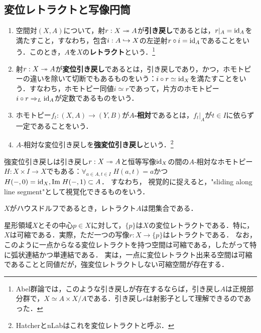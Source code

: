\documentclass[uplatex,dvipdfmx]{jsreport}
\begin{document}
\subsection{変位レトラクトと写像円筒}

\begin{definition}\mbox{}
    \begin{enumerate}
        \item 空間対$(X,A)$について，射$r:X\twoheadrightarrow A$が\textbf{引き戻し}であるとは，$r|_A=\mathrm{id}_A$を満たすこと，すなわち，包含$i:A\hookrightarrow X$の左逆射$r\circ i=\mathrm{id}_A$であることをいう．このとき，$A$を$X$の\textbf{レトラクト}という．\footnote{Abel群論では，このような引き戻しが存在するならば，引き戻し$A$は正規部分群で，$X\simeq A\times X/A$である．引き戻し$r$は射影子として理解できるのであった．}
        \item 射$r:X\twoheadrightarrow A$が\textbf{変位引き戻し}であるとは，引き戻しであり，かつ，ホモトピーの違いを除いて切断でもあるものをいう：$i\circ r\simeq\mathrm{id}_X$を満たすことをいう．すなわち，ホモトピー同値$i\simeq r$であって，片方のホモトピー$i\circ r\Rightarrow_L\mathrm{id}_A$が定数であるものをいう．
        \item ホモトピー$f_t:(X,A)\to(Y,B)$が\textbf{$A$-相対}であるとは，$f_t|_A$が$t\in I$に依らず一定であることをいう．
        \item $A$-相対な変位引き戻しを\textbf{強変位引き戻し}という．\footnote{HatcherとnLabはこれを変位レトラクトと呼ぶ．}
    \end{enumerate}
\end{definition}
\begin{remarks}
    強変位引き戻しは引き戻し$r:X\twoheadrightarrow A$と恒等写像$\mathrm{id}_X$の間の$A$-相対なホモトピー$H:X\times I\to X$でもある：$\forall_{a\in A,t\in I}\;H(a,t)=a$かつ$H(-,0)=\mathrm{id}_X,\mathrm{Im}\; H(-,1)\subset A$．
    すなわち，
    視覚的に捉えると，"sliding along line segment"として視覚化できるものをいう．
\end{remarks}

\begin{lemma}
    $X$がハウスドルフであるとき，レトラクト$A$は閉集合である．
\end{lemma}

\begin{example}[星型領域の変位レトラクト]
    星形領域$X$とその中心$p\in X$に対して，$\{p\}$は$X$の変位レトラクトである．特に，$X$は可縮である．実際，ただ一つの写像$r:X\to\{p\}$はレトラクトである．
    なお，このように一点からなる変位レトラクトを持つ空間は可縮である，したがって特に弧状連結かつ単連結である．
    実は，一点に変位レトラクト出来る空間は可縮であることと同値だが，強変位レトラクトしない可縮空間が存在する．
\end{example}
\end{document}
